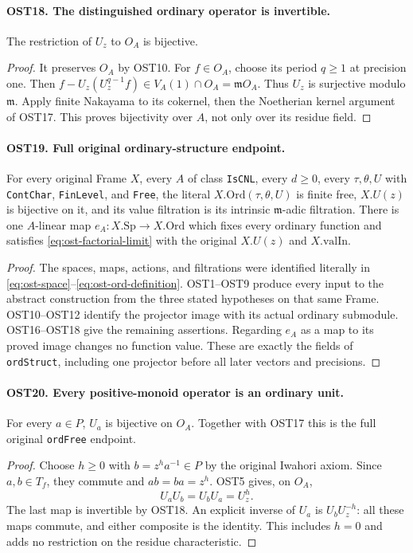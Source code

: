 \paragraph{OST18. The distinguished ordinary operator is invertible.}
\label{claim:OST18}
The restriction of $U_z$ to $O_A$ is bijective.
\begin{proof}
It preserves $O_A$ by OST10.  For $f\in O_A$, choose its
period $q\geq1$ at precision one.  Then
$f-U_z(U_z^{q-1}f)\in V_A(1)\cap O_A=\mathfrak mO_A$.
Thus $U_z$ is surjective modulo $\mathfrak m$.  Apply finite
Nakayama to its cokernel, then the Noetherian kernel argument
of OST17.  This proves bijectivity over $A$, not only over
its residue field.
\end{proof}

\paragraph{OST19. Full original ordinary-structure endpoint.}
\label{claim:OST19}
For every original Frame $X$, every $A$ of class
\texttt{IsCNL}, every $d\geq0$, every $\tau,\theta,U$ with
\texttt{ContChar}, \texttt{FinLevel}, and \texttt{Free}, the
literal $X.\mathrm{Ord}(\tau,\theta,U)$ is finite free,
$X.U(z)$ is bijective on it, and its value filtration is its
intrinsic $\mathfrak m$-adic filtration.  There is one
$A$-linear map $e_A:X.\mathrm{Sp}\to X.\mathrm{Ord}$ which
fixes every ordinary function and satisfies
\eqref{eq:ost-factorial-limit} with the original
$X.U(z)$ and $X.\mathrm{valIn}$.
\begin{proof}
The spaces, maps, actions, and filtrations were identified
literally in \eqref{eq:ost-space}--\eqref{eq:ost-ord-definition}.
OST1--OST9 produce every input to the abstract construction
from the three stated hypotheses on that same Frame.
OST10--OST12 identify the projector image with its actual
ordinary submodule.  OST16--OST18 give the remaining
assertions.  Regarding $e_A$ as a map to its proved image
changes no function value.  These are exactly the fields
of \texttt{ordStruct}, including one projector before all
later vectors and precisions.
\end{proof}

\paragraph{OST20. Every positive-monoid operator is an ordinary unit.}
\label{claim:OST20}
For every $a\in P$, $U_a$ is bijective on $O_A$.  Together
with OST17 this is the full original \texttt{ordFree} endpoint.
\begin{proof}
Choose $h\geq0$ with $b=z^ha^{-1}\in P$ by the original
Iwahori axiom.  Since $a,b\in T_f$, they commute and
$ab=ba=z^h$.  OST5 gives, on $O_A$,
\[
                  U_aU_b=U_bU_a=U_z^h.
\]
The last map is invertible by OST18.  An explicit inverse of
$U_a$ is $U_bU_z^{-h}$: all these maps commute, and either
composite is the identity.  This includes $h=0$ and adds no
restriction on the residue characteristic.
\end{proof}

